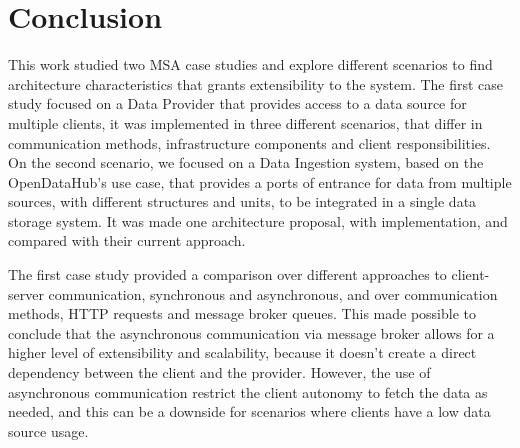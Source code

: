 

\newcommand{\sla}{\textbackslash}

\newcommand{\cmd}[1]{\textsf{#1}}

\newcommand{\pkg}[1]{\textsf{#1}}

\newcommand{\ltxcmd}[1]{\cmd{\sla{}#1}}

\chapter{Conclusion}
\label{chap:conclusion}

This work studied two MSA case studies and explore different scenarios to find architecture characteristics that grants extensibility to the system. The first case study focused on a Data Provider that provides access to a data source for multiple clients, it was implemented in three different scenarios, that differ in communication methods, infrastructure components and client responsibilities. On the second scenario, we focused on a Data Ingestion system, based on the OpenDataHub's use case, that provides a ports of entrance for data from multiple sources, with different structures and units, to be integrated in a single data storage system. It was made one architecture proposal, with implementation, and compared with their current approach.

The first case study provided a comparison over different approaches to client-server communication, synchronous and asynchronous, and over communication methods, HTTP requests and message broker queues. This made possible to conclude that the asynchronous communication via message broker allows for a higher level of extensibility and scalability, because it doesn't create a direct dependency between the client and the provider. However, the use of asynchronous communication restrict the client autonomy to fetch the data as needed, and this can be a downside for scenarios where clients have a low data source usage.

